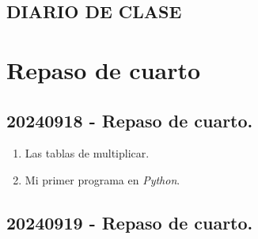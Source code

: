 \documentclass[a4paper,12pt]{article}
\begin{document}
\begin{center}
    \section*{DIARIO DE CLASE}
\end{center}

\tableofcontents

\newpage

\sloppy %

\setcounter{section}{-1}  %
\section{Repaso de cuarto}

\subsection{20240918 - Repaso de cuarto.}

\begin{enumerate}
    \item Las tablas de multiplicar.
    \item Mi primer programa en \textit{Python}.
\end{enumerate}

\subsection{20240919 - Repaso de cuarto.}
\end{document}
